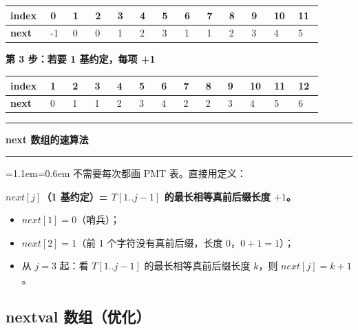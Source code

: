 \documentclass[11pt,openany,UTF8]{ctexbook}
\newcommand{\callouthead}[2]{%
  \par\addvspace{7pt}\noindent
  {\color{#1}\rule[-0.15em]{3pt}{1.05em}}\hspace{0.5em}%
  {\bfseries\color{#1}#2}\par\nobreak\vspace{-0.35em}%
  {\color{rulesep}\hrule height 0.4pt}\nobreak\vspace{0.45em}%
  \begingroup\small\setlength{\parindent}{0pt}%
  \leftskip=1.1em\rightskip=0.6em\noindent\ignorespaces}
\newcommand{\calloutend}{\par\endgroup\addvspace{7pt}}
\newenvironment{callkey}[1]{\callouthead{keybar}{#1}}{\calloutend}
\begin{document}
\begingroup\footnotesize\setlength{\tabcolsep}{1.5pt}
\begin{longtable}{@{}L{0.0768\linewidth}L{0.0683\linewidth}L{0.0683\linewidth}L{0.0683\linewidth}L{0.0683\linewidth}L{0.0683\linewidth}L{0.0683\linewidth}L{0.0683\linewidth}L{0.0683\linewidth}L{0.0683\linewidth}L{0.0683\linewidth}L{0.0683\linewidth}L{0.0683\linewidth}@{}}
\toprule
\textbf{index} & \textbf{0} & \textbf{1} & \textbf{2} & \textbf{3} & \textbf{4} & \textbf{5} & \textbf{6} & \textbf{7} & \textbf{8} & \textbf{9} & \textbf{10} & \textbf{11} \\
\midrule
\endhead
\textbf{next} & -1 & 0 & 0 & 1 & 2 & 3 & 1 & 1 & 2 & 3 & 4 & 5 \\
\bottomrule
\end{longtable}
\endgroup

\textbf{第 3 步：若要 1 基约定，每项 +1}

\begingroup\footnotesize\setlength{\tabcolsep}{1.5pt}
\begin{longtable}{@{}L{0.0768\linewidth}L{0.0683\linewidth}L{0.0683\linewidth}L{0.0683\linewidth}L{0.0683\linewidth}L{0.0683\linewidth}L{0.0683\linewidth}L{0.0683\linewidth}L{0.0683\linewidth}L{0.0683\linewidth}L{0.0683\linewidth}L{0.0683\linewidth}L{0.0683\linewidth}@{}}
\toprule
\textbf{index} & \textbf{1} & \textbf{2} & \textbf{3} & \textbf{4} & \textbf{5} & \textbf{6} & \textbf{7} & \textbf{8} & \textbf{9} & \textbf{10} & \textbf{11} & \textbf{12} \\
\midrule
\endhead
\textbf{next} & 0 & 1 & 1 & 2 & 3 & 4 & 2 & 2 & 3 & 4 & 5 & 6 \\
\bottomrule
\end{longtable}
\endgroup

\begin{callkey}{next 数组的速算法}
不需要每次都画 PMT 表。直接用定义：

\textbf{$next[j]$（1 基约定）= $T[1..j-1]$ 的最长相等真前后缀长度 $+1$。}

\begin{itemize}
\item $next[1]=0$（哨兵）；
\item $next[2]=1$（前 1 个字符没有真前后缀，长度 0，$0+1=1$）；
\item 从 $j=3$ 起：看 $T[1..j-1]$ 的最长相等真前后缀长度 $k$，则 $next[j]=k+1$。
\end{itemize}
\end{callkey}

\subsection{nextval 数组（优化）}
\end{document}
